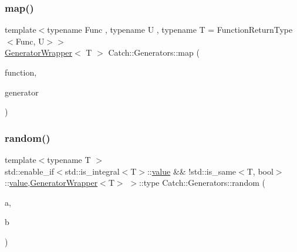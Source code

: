 \subsubsection{\texorpdfstring{map()}{map()}}
{\footnotesize\ttfamily template$<$typename Func , typename U , typename T  = Function\+Return\+Type$<$\+Func, U$>$$>$ \\
\mbox{\hyperlink{class_catch_1_1_generators_1_1_generator_wrapper}{Generator\+Wrapper}}$<$ T $>$ Catch\+::\+Generators\+::map (\begin{DoxyParamCaption}\item[{Func \&\&}]{function,  }\item[{\mbox{\hyperlink{class_catch_1_1_generators_1_1_generator_wrapper}{Generator\+Wrapper}}$<$ U $>$ \&\&}]{generator }\end{DoxyParamCaption})}

\mbox{\label{namespace_catch_1_1_generators_a5003f0b96aaa4b1a53ebd81f4e93ab0c}} 
\subsubsection{\texorpdfstring{random()}{random()}\hspace{0.1cm}{\footnotesize\ttfamily [1/2]}}
{\footnotesize\ttfamily template$<$typename T $>$ \\
std\+::enable\+\_\+if$<$std\+::is\+\_\+integral$<$T$>$\+::\mbox{\hyperlink{namespace_catch_1_1_generators_a3c4989dd0dca44455f55484cedaa18da}{value}} \&\& !std\+::is\+\_\+same$<$T, bool$>$\+::\mbox{\hyperlink{namespace_catch_1_1_generators_a3c4989dd0dca44455f55484cedaa18da}{value}},\mbox{\hyperlink{class_catch_1_1_generators_1_1_generator_wrapper}{Generator\+Wrapper}}$<$T$>$ $>$\+::type Catch\+::\+Generators\+::random (\begin{DoxyParamCaption}\item[{T}]{a,  }\item[{T}]{b }\end{DoxyParamCaption})}

\mbox{\label{namespace_catch_1_1_generators_a677b543146adcdfe23fdfff48007a57e}} 
